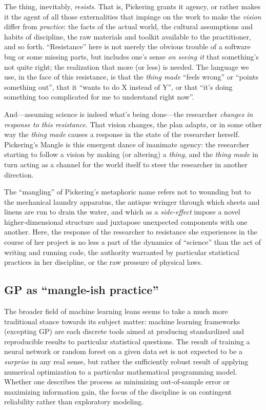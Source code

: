 The thing, inevitably, \emph{resists}. That is, Pickering grants it agency, or rather makes it the agent of all those externalities that impinge on the work to make the \emph{vision} differ from \emph{practice}: the facts of the actual world, the cultural assumptions and habits of discipline, the raw materials and toolkit available to the practitioner, and so forth. ``Resistance'' here is not merely the obvious trouble of a software bug or some missing parts, but includes one's sense \emph{on seeing it} that something's not quite right; the realization that more (or less) is needed. The language we use, in the face of this resistance, is that the \emph{thing made} ``feels wrong'' or ``points something out'', that it ``wants to do X instead of Y'', or that ``it's doing something too complicated for me to understand right now''.

And---assuming science is indeed what's being done---the researcher \emph{changes in response to this resistance}. That vision changes, the plan adapts, or in some other way the \emph{thing made} causes a response in the state of the researcher herself. Pickering's Mangle is this emergent dance of inanimate agency: the researcher starting to follow a vision by making (or altering) a \emph{thing}, and the \emph{thing made} in turn acting as a channel for the world itself to steer the researcher in another direction.

The ``mangling'' of Pickering's metaphoric name refers not to wounding but to the mechanical laundry apparatus, the antique wringer through which sheets and linens are run to drain the water, and which as a \emph{side-effect} impose a novel higher-dimensional structure and juxtapose unexpected components with one another. Here, the response of the researcher to resistance she experiences in the course of her project is no less a part of the dynamics of ``science'' than the act of writing and running code, the authority warranted by particular statistical practices in her discipline, or the raw pressure of physical laws.

\subsection{GP as ``mangle-ish practice''}\hypertarget{gp-as-mangle-ish-practice}{}\label{gp-as-mangle-ish-practice}

The broader field of machine learning leans seems to take a much more traditional stance towards its subject matter: machine learning frameworks (excepting GP) are each discrete tools aimed at producing standardized and reproducible results to particular statistical questions. The result of training a neural network or random forest on a given data set is not expected to be a \emph{surprise} in any real sense, but rather the sufficiently robust result of applying numerical optimization to a particular mathematical programming model. Whether one describes the process as minimizing out-of-sample error or maximizing information gain, the focus of the discipline is on contingent reliability rather than exploratory modeling.

